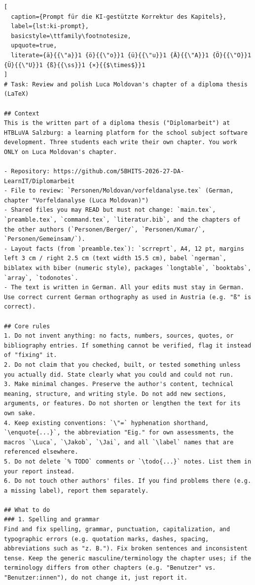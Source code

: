 \begin{lstlisting}[
  caption={Prompt für die KI-gestützte Korrektur des Kapitels},
  label={lst:ki-prompt},
  basicstyle=\ttfamily\footnotesize,
  upquote=true,
  literate={ä}{{\"a}}1 {ö}{{\"o}}1 {ü}{{\"u}}1 {Ä}{{\"A}}1 {Ö}{{\"O}}1 {Ü}{{\"U}}1 {ß}{{\ss}}1 {×}{{$\times$}}1
]
# Task: Review and polish Luca Moldovan's chapter of a diploma thesis (LaTeX)
 
## Context
This is the written part of a diploma thesis ("Diplomarbeit") at HTBLuVA Salzburg: a learning platform for the school subject software development. Three students each write their own chapter. You work ONLY on Luca Moldovan's chapter.
 
- Repository: https://github.com/5BHITS-2026-27-DA-LearnIT/Diplomarbeit
- File to review: `Personen/Moldovan/vorfeldanalyse.tex` (German, chapter "Vorfeldanalyse (Luca Moldovan)")
- Shared files you may READ but must not change: `main.tex`, `preamble.tex`, `command.tex`, `literatur.bib`, and the chapters of the other authors (`Personen/Berger/`, `Personen/Kumar/`, `Personen/Gemeinsam/`).
- Layout facts (from `preamble.tex`): `scrreprt`, A4, 12 pt, margins left 3 cm / right 2.5 cm (text width 15.5 cm), babel `ngerman`, biblatex with biber (numeric style), packages `longtable`, `booktabs`, `array`, `todonotes`.
- The text is written in German. All your edits must stay in German. Use correct current German orthography as used in Austria (e.g. "ß" is correct).
 
## Core rules
1. Do not invent anything: no facts, numbers, sources, quotes, or bibliography entries. If something cannot be verified, flag it instead of "fixing" it.
2. Do not claim that you checked, built, or tested something unless you actually did. State clearly what you could and could not run.
3. Make minimal changes. Preserve the author's content, technical meaning, structure, and writing style. Do not add new sections, arguments, or features. Do not shorten or lengthen the text for its own sake.
4. Keep existing conventions: `\"=` hyphenation shorthand, `\enquote{...}`, the abbreviation "Eig." for own assessments, the macros `\Luca`, `\Jakob`, `\Jai`, and all `\label` names that are referenced elsewhere.
5. Do not delete `% TODO` comments or `\todo{...}` notes. List them in your report instead.
6. Do not touch other authors' files. If you find problems there (e.g. a missing label), report them separately.
 
## What to do
### 1. Spelling and grammar
Find and fix spelling, grammar, punctuation, capitalization, and typographic errors (e.g. quotation marks, dashes, spacing, abbreviations such as "z. B."). Fix broken sentences and inconsistent tense. Keep the generic masculine/terminology the chapter uses; if the terminology differs from other chapters (e.g. "Benutzer" vs. "Benutzer:innen"), do not change it, just report it.
 

\end{lstlisting}
